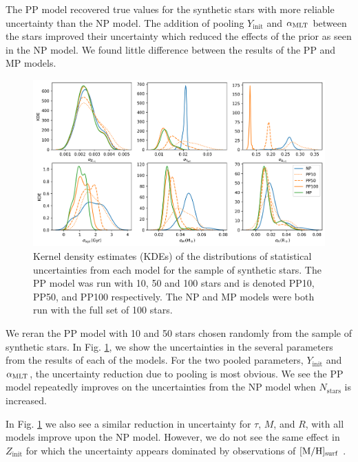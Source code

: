 The PP model recovered true values for the synthetic stars with more reliable uncertainty than the NP model. The addition of pooling $Y_\mathrm{init}$ and ${\alpha_\mathrm{MLT}}$ between the stars improved their uncertainty which reduced the effects of the prior as seen in the NP model. We found little difference between the results of the PP and MP models.

\begin{figure}[tb]
    \centering
    \includegraphics[width=\textwidth]{figures/shrinkage.png}
    \caption[Kernel density estimates of the distributions of statistical uncertainties from each model for the sample of synthetic stars.]{Kernel density estimates (KDEs) of the distributions of statistical uncertainties from each model for the sample of synthetic stars. The PP model was run with 10, 50 and 100 stars and is denoted PP10, PP50, and PP100 respectively. The NP and MP models were both run with the full set of 100 stars.}
    \label{fig:shrinkage}
\end{figure}

We reran the PP model with 10 and 50 stars chosen randomly from the sample of synthetic stars. In Fig. \ref{fig:shrinkage}, we show the uncertainties in the several parameters from the results of each of the models. For the two pooled parameters, $Y_\mathrm{init}$ and ${\alpha_\mathrm{MLT}}$, the uncertainty reduction due to pooling is most obvious. We see the PP model repeatedly improves on the uncertainties from the NP model when $N_\mathrm{stars}$ is increased. 

In Fig. \ref{fig:shrinkage} we also see a similar reduction in uncertainty for $\tau$, $M$, and $R$, with all models improve upon the NP model. However, we do not see the same effect in $Z_\mathrm{init}$ for which the uncertainty appears dominated by observations of $[\mathrm{M}/\mathrm{H}]_\mathrm{surf}$ .


